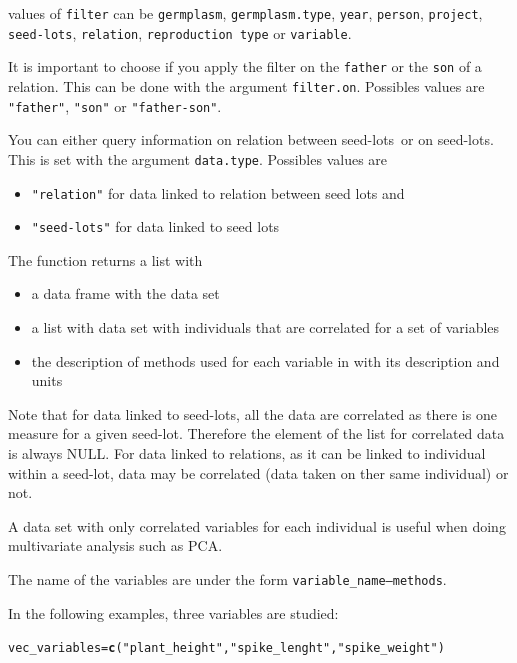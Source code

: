 \documentclass{article}\usepackage[]{graphicx}\usepackage[]{color}
\makeatletter
\newcommand{\hlstr}[1]{\textcolor[rgb]{0.192,0.494,0.8}{#1}}%
\newcommand{\hlstd}[1]{\textcolor[rgb]{0.345,0.345,0.345}{#1}}%
\newcommand{\hlkwb}[1]{\textcolor[rgb]{0.69,0.353,0.396}{#1}}%
\newcommand{\hlkwd}[1]{\textcolor[rgb]{0.737,0.353,0.396}{\textbf{#1}}}%
\newenvironment{kframe}{%
 \def\at@end@of@kframe{}%
 \ifinner\ifhmode%
  \def\at@end@of@kframe{\end{minipage}}%
  \begin{minipage}{\columnwidth}%
 \fi\fi%
 \def\FrameCommand##1{\hskip\@totalleftmargin \hskip-\fboxsep
 \colorbox{shadecolor}{##1}\hskip-\fboxsep
     \hskip-\linewidth \hskip-\@totalleftmargin \hskip\columnwidth}%
 \MakeFramed {\advance\hsize-\width
   \@totalleftmargin\z@ \linewidth\hsize
   \@setminipage}}%
 {\par\unskip\endMakeFramed%
 \at@end@of@kframe}
\newenvironment{knitrout}{}{} %
\renewcommand{\sl}{seed-lots}
\makeatother
\begin{document}
values of \texttt{filter} can be \texttt{germplasm}, \texttt{germplasm.type}, \texttt{year}, \texttt{person}, \texttt{project}, \texttt{\sl}, \texttt{relation}, \texttt{reproduction type} or \texttt{variable}.


It is important to choose if you apply the filter on the \texttt{father} or the \texttt{son} of a relation.
This can be done with the argument \texttt{filter.on}.
Possibles values are \texttt{"father"}, \texttt{"son"} or \texttt{"father-son"}.


You can either query information on relation between \sl~or on \sl.
This is set with the argument \texttt{data.type}.
Possibles values are 

\begin{itemize}
\item \texttt{"relation"} for data linked to relation between seed lots and 
\item \texttt{"seed-lots"} for data linked to seed lots
\end{itemize}


The function returns a list with
\begin{itemize}
\item a data frame with the data set
\item a list with data set with individuals that are correlated for a set of variables
\item the description of methods used for each variable in with its description and units
\end{itemize}

Note that for data linked to seed-lots, all the data are correlated as there is one measure for a given seed-lot. 
Therefore the element of the list for correlated data is always NULL.
For data linked to relations, as it can be linked to individual within a seed-lot, data may be correlated (data taken on ther same individual) or not.

A data set with only correlated variables for each individual is useful when doing multivariate analysis such as PCA.

The name of the variables are under the form \texttt{variable\_name---methods}.

\vspace{.5cm}

In the following examples, three variables are studied:

\begin{knitrout}
\color{fgcolor}\begin{kframe}
\begin{alltt}
\hlstd{vec_variables} \hlkwb{=} \hlkwd{c}\hlstd{(}\hlstr{"plant_height"}\hlstd{,} \hlstr{"spike_lenght"}\hlstd{,} \hlstr{"spike_weight"}\hlstd{)}
\end{alltt}
\end{kframe}
\end{knitrout}
\end{document}
